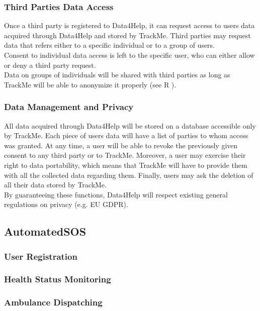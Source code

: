 \documentclass[../../rasd.tex]{subfiles}
\begin{document}
				\subsubsection{Third Parties Data Access}
				Once a third party is registered to Data4Help, it can request access to users data acquired through Data4Help and stored by TrackMe. Third parties may request data that refers either to a specific individual or to a group of users.\\
				Consent to individual data access is left to the specific user, who can either allow or deny a third party request.\\
				Data on groups of individuals will be shared with third parties as long as TrackMe will be able to anonymize it properly (see R ).

				\subsubsection{Data Management and Privacy}
				All data acquired through Data4Help will be stored on a database accessible only by TrackMe. Each piece of users data will have a list of parties to whom access was granted. At any time, a user will be able to revoke the previously given consent to any third party or to TrackMe. Moreover, a user may exercise their right to data portability, which means that TrackMe will have to provide them with all the collected data regarding them. Finally, users may ask the deletion of all their data stored by TrackMe. \\
				By guaranteeing these functions, Data4Help will respect existing general regulations on privacy (e.g. EU GDPR). 
			
			\subsection{AutomatedSOS}
				\subsubsection{User Registration}
				\subsubsection{Health Status Monitoring}
				\subsubsection{Ambulance Dispatching}
\end{document}
